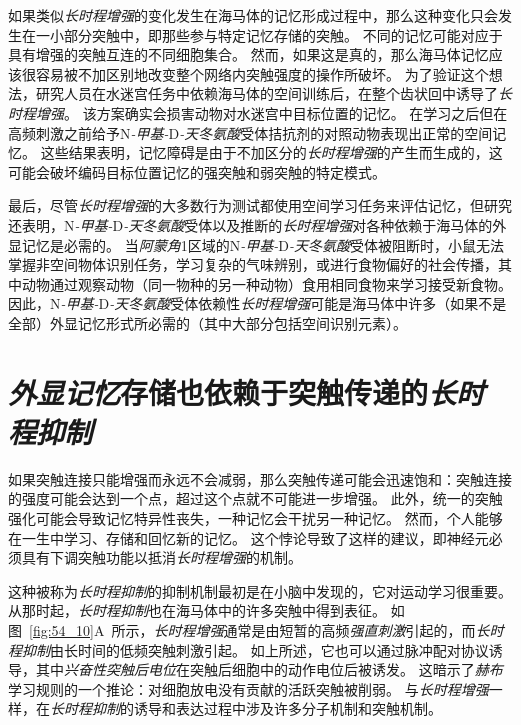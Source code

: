 如果类似\textit{长时程增强}的变化发生在海马体的记忆形成过程中，那么这种变化只会发生在一小部分突触中，即那些参与特定记忆存储的突触。
不同的记忆可能对应于具有增强的突触互连的不同细胞集合。
然而，如果这是真的，那么海马体记忆应该很容易被不加区别地改变整个网络内突触强度的操作所破坏。
为了验证这个想法，研究人员在水迷宫任务中依赖海马体的空间训练后，在整个齿状回中诱导了\textit{长时程增强}。
该方案确实会损害动物对水迷宫中目标位置的记忆。
在学习之后但在高频刺激之前给予N\textit{-甲基-}D\textit{-天冬氨酸}受体拮抗剂的对照动物表现出正常的空间记忆。
这些结果表明，记忆障碍是由于不加区分的\textit{长时程增强}的产生而生成的，这可能会破坏编码目标位置记忆的强突触和弱突触的特定模式。


最后，尽管\textit{长时程增强}的大多数行为测试都使用空间学习任务来评估记忆，但研究还表明，N\textit{-甲基-}D\textit{-天冬氨酸}受体以及推断的\textit{长时程增强}对各种依赖于海马体的外显记忆是必需的。
当\textit{阿蒙角}1区域的N\textit{-甲基-}D\textit{-天冬氨酸}受体被阻断时，小鼠无法掌握非空间物体识别任务，学习复杂的气味辨别，或进行食物偏好的社会传播，其中动物通过观察动物（同一物种的另一种动物）食用相同食物来学习接受新食物。
因此，N\textit{-甲基-}D\textit{-天冬氨酸}受体依赖性\textit{长时程增强}可能是海马体中许多（如果不是全部）外显记忆形式所必需的（其中大部分包括空间识别元素）。



\section{\textit{外显记忆}存储也依赖于突触传递的\textit{长时程抑制}}

如果突触连接只能增强而永远不会减弱，那么突触传递可能会迅速饱和：突触连接的强度可能会达到一个点，超过这个点就不可能进一步增强。
此外，统一的突触强化可能会导致记忆特异性丧失，一种记忆会干扰另一种记忆。
然而，个人能够在一生中学习、存储和回忆新的记忆。
这个悖论导致了这样的建议，即神经元必须具有下调突触功能以抵消\textit{长时程增强}的机制。


这种被称为\textit{长时程抑制}的抑制机制最初是在小脑中发现的，它对运动学习很重要。
从那时起，\textit{长时程抑制}也在海马体中的许多突触中得到表征。
如图~\ref{fig:54_10}A~所示，\textit{长时程增强}通常是由短暂的高频\textit{强直刺激}引起的，而\textit{长时程抑制}由长时间的低频突触刺激引起。
如上所述，它也可以通过脉冲配对协议诱导，其中\textit{兴奋性突触后电位}在突触后细胞中的动作电位后被诱发。
这暗示了\textit{赫布}学习规则的一个推论：对细胞放电没有贡献的活跃突触被削弱。
与\textit{长时程增强}一样，在\textit{长时程抑制}的诱导和表达过程中涉及许多分子机制和突触机制。


